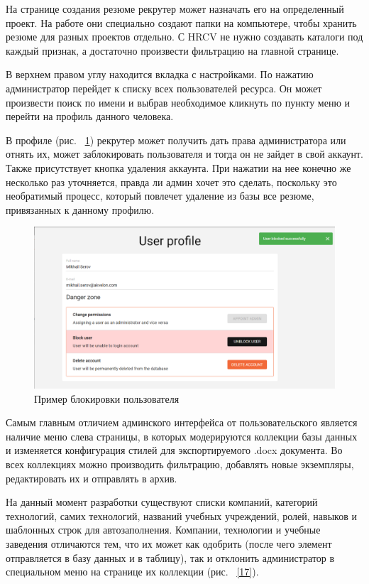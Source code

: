 \documentclass[a4paper,12pt]{diplom}
\begin{document}
На странице создания резюме рекрутер может назначать его на определенный проект. На работе они специально создают папки на компьютере, чтобы хранить резюме для разных проектов отдельно. С HRCV не нужно создавать каталоги под каждый признак, а достаточно произвести фильтрацию на главной странице.

В верхнем правом углу находится вкладка с настройками. По нажатию администратор перейдет к списку всех пользователей ресурса. Он может произвести поиск по имени и выбрав необходимое кликнуть по пункту меню и перейти на профиль данного человека.

В профиле (рис. ~\ref{16}) рекрутер может получить дать права администратора или отнять их, может заблокировать пользователя и тогда он не зайдет в свой аккаунт.
Также присутствует кнопка удаления аккаунта. При нажатии на нее конечно же несколько раз уточняется, правда ли админ хочет это сделать, поскольку это необратимый процесс, который повлечет удаление из базы все резюме, привязанных к данному профилю.


\begin{figure}[!ht]
\centering
\includegraphics[width=1\textwidth]{resources/dangerzone.png}
\caption{Пример блокировки пользователя}
\label{16}
\end{figure}

Самым главным отличием админского интерфейса от пользовательского является наличие меню слева страницы, в которых модерируются коллекции базы данных и изменяется конфигурация стилей для экспортируемого .docx документа. Во всех коллекциях можно производить фильтрацию, добавлять новые экземпляры, редактировать их и отправлять в архив.

На данный момент разработки существуют списки компаний, категорий технологий, самих технологий, названий учебных учреждений, ролей, навыков и шаблонных строк для автозаполнения. Компании, технологии и учебные заведения отличаются тем, что их может как одобрить (после чего элемент отправляется в базу данных и в таблицу), так и отклонить администратор в
специальном меню на странице их коллекции (рис. ~\ref{17}).
\end{document}
